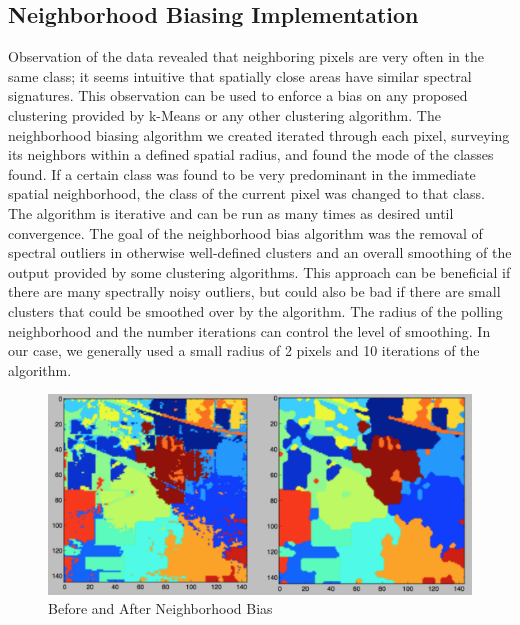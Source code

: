 \documentclass[journal]{IEEEtran}
\begin{document}
  \subsection{Neighborhood Biasing Implementation}
    Observation of the data revealed that neighboring pixels are very often in the same class; it seems intuitive that spatially close areas have similar spectral signatures. This observation can be used to enforce a bias on any proposed clustering provided by k-Means or any other clustering algorithm. The neighborhood biasing algorithm we created iterated through each pixel, surveying its neighbors within a defined spatial radius, and found the mode of the classes found. If a certain class was found to be very predominant in the immediate spatial neighborhood, the class of the current pixel was changed to that class. The algorithm is iterative and can be run as many times as desired until convergence. The goal of the neighborhood bias algorithm was the removal of spectral outliers in otherwise well-defined clusters and an overall smoothing of the output provided by some clustering algorithms. This approach can be beneficial if there are many spectrally noisy outliers, but could also be bad if there are small clusters that could be smoothed over by the algorithm. The radius of the polling neighborhood and the number iterations can control the level of smoothing. In our case, we generally used a small radius of 2 pixels and 10 iterations of the algorithm.\\

    \begin{figure}[h!]
      \centering\includegraphics[width=\columnwidth]{images/BandUnB.png}
      \caption{Before and After Neighborhood Bias}
      \label{fig:NeighborhoodBias}
    \end{figure}
\end{document}
